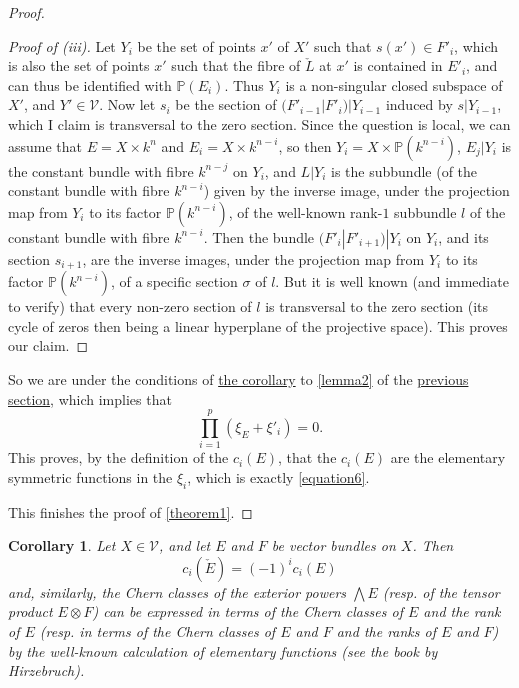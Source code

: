\documentclass{article}
\theoremstyle{plain}
\newtheorem*{corollary}{Corollary}
\theoremstyle{definition}
\newcommand{\cat}{\mathcal}
\newcommand{\oldpage}[1]{\marginpar{\footnotesize$\Big\vert$ \textit{p.~#1}}}
\begin{document}
\begin{proof}
\begin{proof}[Proof of \rm{(iii)}]
    Let $Y_i$ be the set of points $x'$ of $X'$ such that $s(x')\in F'_i$, which is also the set of points $x'$ such that the fibre of $\check{L}$ at $x'$ is contained in $E'_i$, and can thus be identified with $\mathbb{P}(E_i)$.
    Thus $Y_i$ is a non-singular closed subspace of $X'$, and $Y'\in\cat{V}$.
    Now let $s_i$ be the section of $(F'_{i-1}|F'_i)|Y_{i-1}$ induced by $s|Y_{i-1}$, which I claim is transversal to the zero section.
    Since the question is local, we
\oldpage{147}
    can assume that $E=X\times k^n$ and $E_i=X\times k^{n-i}$, so then $Y_i=X\times\mathbb{P}(k^{n-i})$, $E_j|Y_i$ is the constant bundle with fibre $k^{n-j}$ on $Y_i$, and $L|Y_i$ is the subbundle (of the constant bundle with fibre $k^{n-i}$) given by the inverse image, under the projection map from $Y_i$ to its factor $\mathbb{P}(k^{n-i})$, of the well-known rank-$1$ subbundle $l$ of the constant bundle with fibre $k^{n-i}$.
    Then the bundle $(F'_i|F'_{i+1})|Y_i$ on $Y_i$, and its section $s_{i+1}$, are the inverse images, under the projection map from $Y_i$ to its factor $\mathbb{P}(k^{n-i})$, of a specific section $\sigma$ of $l$.
    But it is well known (and immediate to verify) that every non-zero section of $l$ is transversal to the zero section (its cycle of zeros then being a linear hyperplane of the projective space).
    This proves our claim.
  \end{proof}

  So we are under the conditions of \hyperref[lemma2corollary]{the corollary} to \cref{lemma2} of the \hyperref[section2]{previous section}, which implies that
  \[
    \prod_{i=1}^p (\xi_E+\xi'_i) = 0.
  \]
  This proves, by the definition of the $c_i(E)$, that the $c_i(E)$ are the elementary symmetric functions in the $\xi_i$, which is exactly \cref{equation6}.

  This finishes the proof of \cref{theorem1}.
\end{proof}

\begin{corollary}
\label{theorem1corollary}
  Let $X\in\cat{V}$, and let $E$ and $F$ be vector bundles on $X$.
  Then
  \[
  \label{equation7}
    c_i(\check{E}) = (-1)^i c_i(E)
  \tag{7}
  \]
  and, similarly, the Chern classes of the exterior powers $\bigwedge E$ (resp. of the tensor product $E\otimes F$) can be expressed in terms of the Chern classes of $E$ and the rank of $E$ (resp. in terms of the Chern classes of $E$ and $F$ and the ranks of $E$ and $F$) by the well-known calculation of elementary functions (see the book by Hirzebruch).
\end{corollary}
\end{document}
